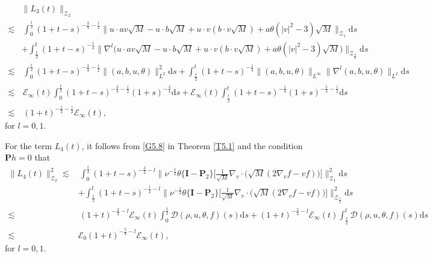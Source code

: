 \documentclass[reqno,11pt]{amsart}
\theoremstyle{plain}
\numberwithin{equation}{section}
\begin{document}
\begin{align}\label{G5.59}
&\| L_3(t)\|_{\mathcal{Z}_2}\nonumber\\
\lesssim&\, \int_0^{\frac{t}{2}}(1+t-s)^{-\frac{3}{4}-\frac{l}{2}}\|u\cdot av\sqrt{M}-u\cdot b\sqrt{M}+u\cdot v(b\cdot v\sqrt{M})+a\theta(|v|^2-3)\sqrt{M}\|_{\mathcal{Z}_1}\mathrm{d}s\nonumber\\
&+ \int_{\frac{t}{2}}^{t}(1+t-s)^{-\frac{1}{4}}\big\|\nabla^l\big(u\cdot av\sqrt{M}-u\cdot b\sqrt{M}+u\cdot v(b\cdot v\sqrt{M})+a\theta(|v|^2-3)\sqrt{M}\big)\big\|_{\mathcal{Z}_{\frac{3}{2}}}\mathrm{d}s\nonumber\\
\lesssim&\, \int_0^{\frac{t}{2}}(1+t-s)^{-\frac{3}{4}-\frac{l}{2}}  \|(a,b,u,\theta)\|_{L^2}^2       
  \mathrm{d}s +\int_{\frac{t}{2}}^t(1+t-s)^{-\frac{1}{4}} \|(a,b,u,\theta)\|_{L^\infty}  \|\nabla^l (a,b,u,\theta)\|_{L^2}\mathrm{d}s\nonumber\\
\lesssim& \,\mathcal{E}_{ \infty}(t)\int_0^{\frac{t}{2}}(1+t-s)^{-\frac{3}{4}-\frac{l}{2}}(1+s)^{-\frac{3}{4}}
  \mathrm{d}s + \mathcal{E}_{ \infty}(t)\int_{\frac{t}{2}}^{t}(1+t-s)^{-\frac{1}{4}}(1+s)^{-\frac{5}{4}-\frac{l}{2}}
  \mathrm{d}s\nonumber\\
\lesssim&\, (1+t)^{-\frac{1}{2}-\frac{l}{2}}\mathcal{E}_{ \infty}(t), 
\end{align}
for $l=0,1$.

For the term $ L_4(t) $, it follows from \eqref{G5.8} in Theorem \ref{T5.1} and the condition $\mathbf{P}h=0$ that  
\begin{align}\label{G5.60}
\| L_4(t)\|_{\mathcal{Z}_2}^2   \lesssim&\,  \int_0^{\frac{t}{2}}(1+t-s)^{-\frac{3}{2}-l}
\Big\|\nu^{-\frac{1}{2}}  \theta \{\mathbf{I} - \mathbf{P}_2\} \Big[\frac{1}{\sqrt{M}} \nabla_v \cdot \big(\sqrt{M} (2 \nabla_v f - v f)\big)\Big]\Big\|_{\mathcal{Z}_1}^2\mathrm{d}s\nonumber\\
&+  \int_{\frac{t}{2}}^{t}(1+t-s)^{-\frac{1}{2}-l}
\Big\|\nu^{-\frac{1}{2}}  \theta \{\mathbf{I} - \mathbf{P}_2\} \Big[\frac{1}{\sqrt{M}} \nabla_v \cdot \big(\sqrt{M} (2 \nabla_v f - v f)\big)\Big]\Big\|_{\mathcal{Z}_{\frac{3}{2}}}^2\mathrm{d}s\nonumber\\
\lesssim&\,  (1+t)^{-\frac{3}{2}-l}\mathcal{E}_{\infty}(t)\int_0^{\frac{t}{2}}
\mathcal{D}(\rho,u,\theta,f)(s)\mathrm{d}s + (1+t)^{-\frac{5}{4}-l}\mathcal{E}_{\infty}(t)\int_{\frac{t}{2}}^t\mathcal{D}(\rho,u,\theta,f)(s)\mathrm{d}s\nonumber\\
\lesssim\,& \mathcal{E}_0(1+t)^{-\frac{5}{4}-l}\mathcal{E}_{\infty}(t),
\end{align}
for $l=0,1$.
\end{document}
